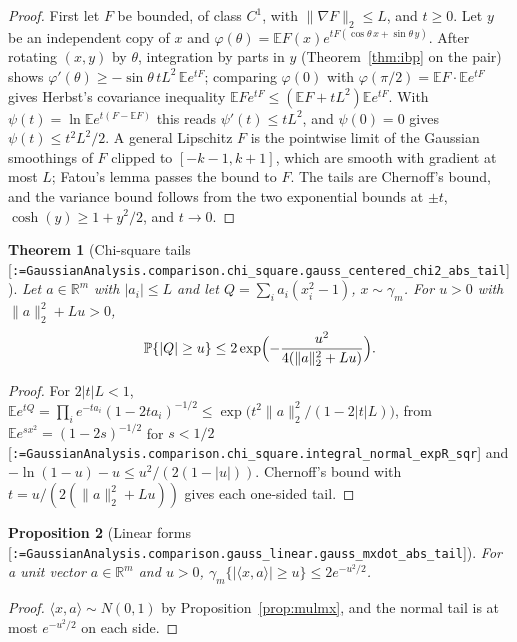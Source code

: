 \documentclass[11pt]{article}
\makeatletter
\newcommand{\formal@break}[1]{\@tfor\formal@tok:=#1\do{%
  \formal@tok
  \expandafter\ifx\formal@tok.\allowbreak\else
  \expandafter\ifx\formal@tok\_\allowbreak\fi\fi}}
\DeclareRobustCommand{\formal}[1]{\textnormal{[\texttt{\small\formal@break{#1}}]}}
\newcommand{\R}{\mathbb{R}}
\newcommand{\E}{\mathbb{E}}
\newcommand{\Prob}{\mathbb{P}}
\newcommand{\ip}[2]{\langle #1, #2\rangle}
\newcommand{\norm}[1]{\lVert #1\rVert}
\newcommand{\abs}[1]{\lvert #1\rvert}
\newcommand{\gauss}{\gamma}
\theoremstyle{plain}
\newtheorem{theorem}{Theorem}[section]
\newtheorem{proposition}[theorem]{Proposition}
\theoremstyle{definition}
\makeatother
\begin{document}
\begin{proof}
First let $F$ be bounded, of class $C^1$, with $\norm{\nabla F}_2 \le L$,
and $t \ge 0$. Let $y$ be an independent copy of $x$ and
$\varphi(\theta) = \E F(x) e^{tF(\cos\theta\, x + \sin\theta\, y)}$.
After rotating $(x, y)$ by $\theta$, integration by parts in $y$
(Theorem~\ref{thm:ibp} on the pair) shows $\varphi'(\theta) \ge -\sin\theta\, tL^2\, \E e^{tF}$;
comparing $\varphi(0)$ with $\varphi(\pi/2) = \E F \cdot \E e^{tF}$ gives
Herbst's covariance inequality $\E F e^{tF} \le (\E F + tL^2)\E e^{tF}$.
With $\psi(t) = \ln \E e^{t(F - \E F)}$ this reads
$\psi'(t) \le tL^2$, and $\psi(0) = 0$ gives $\psi(t) \le t^2L^2/2$.
A general Lipschitz $F$ is the pointwise limit of the Gaussian smoothings
of $F$ clipped to $[-k-1, k+1]$, which are smooth with gradient at most
$L$; Fatou's lemma passes the bound to $F$. The tails are Chernoff's
bound, and the variance bound follows from the two exponential bounds at
$\pm t$, $\cosh(y) \ge 1 + y^2/2$, and $t \to 0$.
\end{proof}

\begin{theorem}[Chi-square tails \formal{GaussianAnalysis.comparison.chi\_square.gauss\_centered\_chi2\_abs\_tail}]\label{thm:chi2}
Let $a \in \R^m$ with $\abs{a_i} \le L$ and let $Q = \sum_i a_i (x_i^2 - 1)$,
$x \sim \gauss_m$. For $u > 0$ with $\norm{a}_2^2 + Lu > 0$,
\[
\Prob\{\abs{Q} \ge u\} \le 2\exp\Bigl(-\frac{u^2}{4(\norm{a}_2^2 + Lu)}\Bigr).
\]
\end{theorem}

\begin{proof}
For $2\abs{t}L < 1$, $\E e^{tQ} = \prod_i e^{-ta_i}(1 - 2ta_i)^{-1/2} \le \exp\bigl(t^2\norm{a}_2^2/(1 - 2\abs{t}L)\bigr)$,
from $\E e^{sx^2} = (1-2s)^{-1/2}$ for $s < 1/2$
\formal{GaussianAnalysis.comparison.chi\_square.integral\_normal\_expR\_sqr}
and $-\ln(1-u) - u \le u^2/(2(1-\abs{u}))$. Chernoff's bound with
$t = u/(2(\norm{a}_2^2 + Lu))$ gives each one-sided tail.
\end{proof}

\begin{proposition}[Linear forms \formal{GaussianAnalysis.comparison.gauss\_linear.gauss\_mxdot\_abs\_tail}]\label{prop:linear}
For a unit vector $a \in \R^m$ and $u > 0$, $\gauss_m\{\abs{\ip{x}{a}} \ge u\} \le 2e^{-u^2/2}$.
\end{proposition}

\begin{proof}
$\ip{x}{a} \sim N(0,1)$ by Proposition~\ref{prop:mulmx}, and the normal
tail is at most $e^{-u^2/2}$ on each side.
\end{proof}
\end{document}
